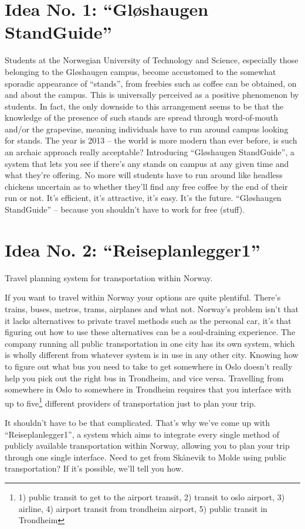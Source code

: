 \section{Idea No. 1: ``Gløshaugen StandGuide''}
	Students at the Norwegian University of Technology and Science, 
	especially those belonging to the Gløshaugen campus, 
	become accustomed to the somewhat sporadic appearance of ``stands'', 
	from freebies such as coffee can be obtained, on and about the campus.
	This is universally perceived as a positive phenomenon by students.
	In fact, the only downside to this arrangement seems to be that the knowledge of the presence of such stands are spread through word-of-mouth and/or the grapevine,
	meaning individuals have to run around campus looking for stands.
	The year is 2013 -- the world is more modern than ever before, 
	is such an archaic approach really acceptable?
	Introducing ``Gløshaugen StandGuide'', a system that lets you see if there's any stands on campus at any given time and what they're offering.
	No more will students have to run around like headless chickens uncertain as to whether they'll find any free coffee by the end of their run or not.
	It's efficient, it's attractive, it's easy.
	It's the future.
	``Gløshaugen StandGuide'' -- because you shouldn't have to work for free (stuff).

\section{Idea No. 2: ``Reiseplanlegger1''}
	Travel planning system for transportation within Norway.

	If you want to travel within Norway your options are quite plentiful.
	There's trains, buses, metros, trams, airplanes and what not.
	Norway's problem isn't that it lacks alternatives to private travel methods such as the personal car, 
	it's that figuring out how to use these alternatives can be a soul-draining experience.
	The company running all public transportation in one city has its own system,
	which is wholly different from whatever system is in use in any other city.
	Knowing how to figure out what bus you need to take to get somewhere in Oslo doesn't really help you pick out the right bus in Trondheim, and vice versa.
	Travelling from somewhere in Oslo to somewhere in Trondheim requires that you interface with up to five\footnote{1) public transit to get to the airport transit, 2) transit to oslo airport, 3) airline, 4) airport transit from trondheim airport, 5) public transit in Trondheim} different providers of transportation just to plan your trip.

	It shouldn't have to be that complicated.
	That's why we've come up with ``Reiseplanlegger1'',
	a system which aims to integrate every single method of publicly available transportation within Norway, 
	allowing you to plan your trip through one single interface. 
	Need to get from Skånevik to Molde using public transportation?
	If it's possible, we'll tell you how.